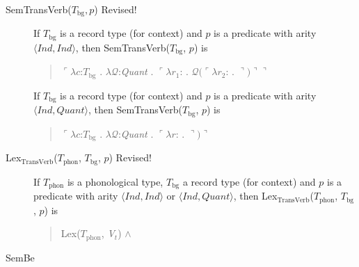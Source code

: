 \begin{description}
        
      \item[\textnormal{SemTransVerb($T_{\mathrm{bg}}, p$)} Revised!] \mbox{}

        If $T_{\text{bg}}$ is a record type (for context) and $p$ is a
        predicate with arity $\langle\textit{Ind},\textit{Ind}\rangle$, then SemTransVerb($T_{\mathrm{bg}}$, $p$) is
        \begin{quote}
          $\ulcorner\lambda c$:$T_{\mathrm{bg}}$ . $\lambda
          \mathcal{Q}$:\textit{Quant} . $\ulcorner\lambda
          r_1$: . $\mathcal{Q}(\ulcorner\lambda r_2$:
          . $\urcorner)\urcorner\urcorner$
        \end{quote}

        If $T_{\text{bg}}$ is a record type (for context) and $p$ is a
  predicate with arity $\langle\textit{Ind},\textit{Quant}\rangle$, then SemTransVerb($T_{\mathrm{bg}}$, $p$) is
  \begin{quote}
    $\ulcorner\lambda c$:$T_{\mathrm{bg}}$ . $\lambda
    \mathcal{Q}$:\textit{Quant} . $\ulcorner\lambda
    r$:
    . $\urcorner)\urcorner$
  \end{quote}
        
\item[\textnormal{Lex$_{\mathrm{TransVerb}}$($T_{\mathrm{phon}}$,
          $T_{\mathrm{bg}}$, $p$)} Revised!] \mbox{}

        If $T_{\mathrm{phon}}$ is a phonological type,
        $T_{\mathrm{bg}}$ a record type (for context) and $p$ is a
        predicate with arity $\langle\textit{Ind},\textit{Ind}\rangle$
        or $\langle\textit{Ind},\textit{Quant}\rangle$, then Lex$_{\mathrm{TransVerb}}$($T_{\mathrm{phon}}$,
        $T_{\mathrm{bg}}$, $p$) is
        \begin{quote}
          Lex($T_{\mathrm{phon}}$, \textit{V$_t$}) \d{$\wedge$}
        \end{quote}

        

        
      \item[\textnormal{SemBe}] \mbox{}



\end{description}
